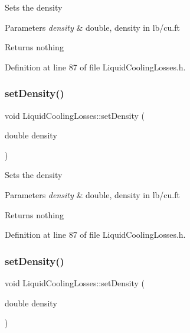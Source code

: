 Sets the density


\begin{DoxyParams}{Parameters}
{\em density} & double, density in lb/cu.\+ft\\
\hline
\end{DoxyParams}
\begin{DoxyReturn}{Returns}
nothing 
\end{DoxyReturn}


Definition at line 87 of file Liquid\+Cooling\+Losses.\+h.

\mbox{\label{class_liquid_cooling_losses_a1fcb1780b588e0a6e5ca052ce2b360dc}} 
\subsubsection{\texorpdfstring{set\+Density()}{setDensity()}\hspace{0.1cm}{\footnotesize\ttfamily [2/3]}}
{\footnotesize\ttfamily void Liquid\+Cooling\+Losses\+::set\+Density (\begin{DoxyParamCaption}\item[{double}]{density }\end{DoxyParamCaption})\hspace{0.3cm}{\ttfamily [inline]}}

Sets the density


\begin{DoxyParams}{Parameters}
{\em density} & double, density in lb/cu.\+ft\\
\hline
\end{DoxyParams}
\begin{DoxyReturn}{Returns}
nothing 
\end{DoxyReturn}


Definition at line 87 of file Liquid\+Cooling\+Losses.\+h.

\mbox{\label{class_liquid_cooling_losses_a1fcb1780b588e0a6e5ca052ce2b360dc}} 
\subsubsection{\texorpdfstring{set\+Density()}{setDensity()}\hspace{0.1cm}{\footnotesize\ttfamily [3/3]}}
{\footnotesize\ttfamily void Liquid\+Cooling\+Losses\+::set\+Density (\begin{DoxyParamCaption}\item[{double}]{density }\end{DoxyParamCaption})\hspace{0.3cm}{\ttfamily [inline]}}

